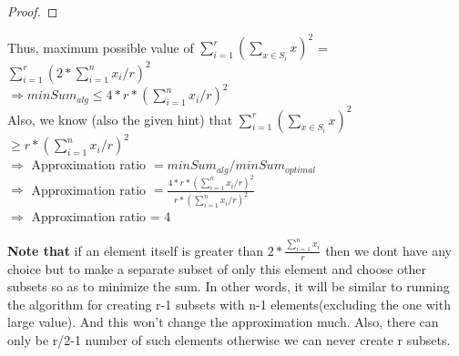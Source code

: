 \documentclass[11pt]{article}
\begin{document}
\begin{enumerate}
\begin{proof}
    \end{proof}
    Thus, maximum possible value of $\sum_{i=1}^r (\sum_{x \in S_i} x)^2$ = $\sum_{i=1}^r (2*\sum_{i=1}^n x_i/r)^2$ \\
    $\Longrightarrow minSum_{alg} \leq 4*r*(\sum_{i=1}^n x_i/r)^2$ \\
    Also, we know (also the given hint) that $\sum_{i=1}^r (\sum_{x \in S_i} x)^2$ $\geq r*(\sum_{i=1}^n x_i/r)^2$ \\
    $\Longrightarrow$ Approximation ratio $= minSum_{alg}/minSum_{optimal}$ \\
    $\Longrightarrow$ Approximation ratio $=  \frac{4*r*(\sum_{i=1}^n x_i/r)^2}{r*(\sum_{i=1}^n x_i/r)^2}$\\
    $\Longrightarrow$ Approximation ratio = 4
    
    \textbf{Note that} if an element itself is greater than $2*\frac{\sum_{i=1}^n x_i}{r}$ then we dont have any choice but to make a separate subset of only this element and choose other subsets so as to minimize the sum. In other words, it will be similar to running the algorithm for creating r-1 subsets with n-1 elements(excluding the one with large value). And this won't change the approximation much. Also, there can only be r/2-1 number of such elements otherwise we can never create r subsets.
\end{enumerate}
\newpage
\end{document}
